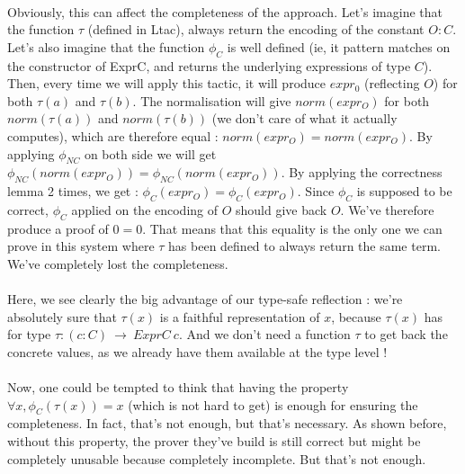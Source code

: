 \documentclass{llncs}
\begin{document}
\\
Obviously, this can affect the completeness of the approach. Let's imagine that the function $\tau$ (defined in Ltac), always return the encoding of the constant $O:C$. Let's also imagine that the function $\phi_C$ is well defined (ie, it pattern matches on the constructor of ExprC, and returns the underlying expressions of type $C$). Then, every time we will apply this tactic, it will produce $expr_0$ (reflecting $O$) for both $\tau(a)$ and $\tau(b)$. The normalisation will give $norm(expr_O)$ for both $norm(\tau(a))$ and $norm(\tau(b))$ (we don't care of what it actually computes), which are therefore equal : 
$norm(expr_O) = norm(expr_O)$. By applying $\phi_{NC}$ on both side we will get $\phi_{NC} (norm(expr_O)) = \phi_{NC} (norm(expr_O))$. By applying the correctness lemma 2 times, we get :
$\phi_C (expr_O) = \phi_C (expr_O)$. Since $\phi_C$ is supposed to be correct, $\phi_C$ applied on the encoding of $O$ should give back $O$. We've therefore produce a proof of $0=0$. That means that this equality is the only one we can prove in this system where $\tau$ has been defined to always return the same term. We've completely lost the completeness.
\\
\\
Here, we see clearly the big advantage of our type-safe reflection : we're absolutely sure that $\tau(x)$ is a faithful representation of $x$, because $\tau(x)$ has for type $\tau : (c:C)\ \rightarrow\ ExprC\ c$. And we don't need a function $\tau$ to get back the concrete values, as we already have them available at the type level !
\\
\\
Now, one could be tempted to think that having the property $\forall x, \phi_C (\tau(x)) = x$ (which is not hard to get) is enough for ensuring the completeness. In fact, that's not enough, but that's necessary. As shown before, without this property, the prover they've build is still correct but might be completely unusable because completely incomplete. But that's not enough.
\end{document}
